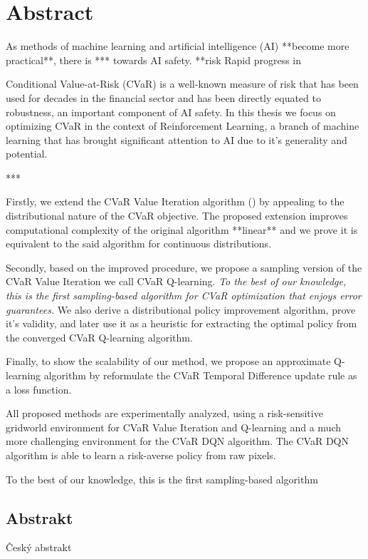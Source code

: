 \begingroup
\let\clearpage\relax
\let\cleardoublepage\relax
\let\cleardoublepage\relax

\chapter*{Abstract}


As methods of machine learning and artificial intelligence (AI) **become more practical**, there is *** towards AI safety. 
**risk
Rapid progress in  

Conditional Value-at-Risk (CVaR) is a well-known measure of risk that has been used for decades in the financial sector and has been directly equated to robustness, an important component of AI safety. In this thesis we focus on optimizing CVaR in the context of Reinforcement Learning, a branch of machine learning that has brought significant attention to AI due to it's generality and potential.

***

Firstly, we extend the CVaR Value Iteration algorithm (\citet{chow2015risk}) by appealing to the distributional nature of the CVaR objective. The proposed extension improves computational complexity of the original algorithm **linear** and we prove it is equivalent to the said algorithm for continuous distributions.

Secondly, based on the improved procedure, we propose a sampling version of the CVaR Value Iteration we call CVaR Q-learning. \textit{To the best of our knowledge, this is the first sampling-based algorithm for CVaR optimization that enjoys error guarantees.} We also derive a distributional policy improvement algorithm, prove it's validity, and later use it as a heuristic for extracting the optimal policy from the converged CVaR Q-learning algorithm.

Finally, to show the scalability of our method, we propose an approximate Q-learning algorithm by reformulate the CVaR Temporal Difference update rule as a loss function.

All proposed methods are experimentally analyzed, using a risk-sensitive gridworld environment for CVaR Value Iteration and Q-learning and a much more challenging environment for the CVaR DQN algorithm. The CVaR DQN algorithm is able to learn a risk-averse policy from raw pixels.

To the best of our knowledge, this is the first sampling-based algorithm 


\vfill

\begin{otherlanguage}{czech}
\chapter*{Abstrakt}
Český abstrakt
\end{otherlanguage}

\endgroup

\vfill
